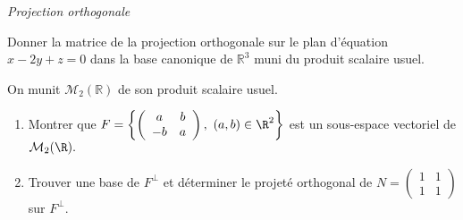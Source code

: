 \documentclass[a4paper,10pt]{report}
\begin{document}
\medskip

\begin{center}
\textit{{ {\large Projection orthogonale}}}
\end{center}

\medskip

\begin{Exercice}{} Donner la matrice de la projection orthogonale sur le plan d'équation $x-2y+z=0$ dans la base canonique de $\mathbb{R}^3$ muni du produit scalaire usuel.
\end{Exercice}

%
%

 \begin{Exercice}{} On munit $\mathcal{M}_2(\mathbb{R})$ de son produit scalaire usuel.
\begin{enumerate}
\item Montrer que $F=\left\{\left(\begin{array}{cc} a & b\\ -b & a \end{array}\right),\ (a,b)\in\R^2\right
\}$ est un sous-espace vectoriel de ${\cal M}_2(\R).$
\item Trouver une base de $F^{\perp}$ et d\'eterminer le projet\'e orthogonal de $N=\left(\begin{array}{cc} 1&1\\ 1&1 \end{array}\right)$ sur $F^{\perp}$.
\end{enumerate}
\end{Exercice}
\end{document}
